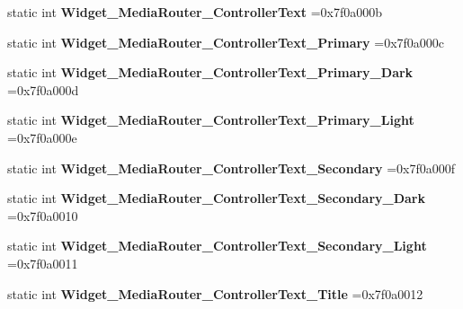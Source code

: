\begin{DoxyCompactItemize}
static int {\bfseries Widget\+\_\+\+Media\+Router\+\_\+\+Controller\+Text} =0x7f0a000b
\item 
\mbox{\label{classandroid_1_1support_1_1v7_1_1appcompat_1_1R_1_1style_ac0b48f6d0fdcad83bf741e24772ccc93}} 
static int {\bfseries Widget\+\_\+\+Media\+Router\+\_\+\+Controller\+Text\+\_\+\+Primary} =0x7f0a000c
\item 
\mbox{\label{classandroid_1_1support_1_1v7_1_1appcompat_1_1R_1_1style_a9ed254b1251537536e7589173d0a1ccd}} 
static int {\bfseries Widget\+\_\+\+Media\+Router\+\_\+\+Controller\+Text\+\_\+\+Primary\+\_\+\+Dark} =0x7f0a000d
\item 
\mbox{\label{classandroid_1_1support_1_1v7_1_1appcompat_1_1R_1_1style_aceca795b7c7f0e08ff1e2d0caf0cbe96}} 
static int {\bfseries Widget\+\_\+\+Media\+Router\+\_\+\+Controller\+Text\+\_\+\+Primary\+\_\+\+Light} =0x7f0a000e
\item 
\mbox{\label{classandroid_1_1support_1_1v7_1_1appcompat_1_1R_1_1style_a110e6b240112126796aa510f5ff2bebd}} 
static int {\bfseries Widget\+\_\+\+Media\+Router\+\_\+\+Controller\+Text\+\_\+\+Secondary} =0x7f0a000f
\item 
\mbox{\label{classandroid_1_1support_1_1v7_1_1appcompat_1_1R_1_1style_a2798f36d52f6989290c5a34dc8d25c2a}} 
static int {\bfseries Widget\+\_\+\+Media\+Router\+\_\+\+Controller\+Text\+\_\+\+Secondary\+\_\+\+Dark} =0x7f0a0010
\item 
\mbox{\label{classandroid_1_1support_1_1v7_1_1appcompat_1_1R_1_1style_abd91649dc2cfc761c12e551cc9496789}} 
static int {\bfseries Widget\+\_\+\+Media\+Router\+\_\+\+Controller\+Text\+\_\+\+Secondary\+\_\+\+Light} =0x7f0a0011
\item 
\mbox{\label{classandroid_1_1support_1_1v7_1_1appcompat_1_1R_1_1style_a1c2277c3cb408e7b6da3e179b4165405}} 
static int {\bfseries Widget\+\_\+\+Media\+Router\+\_\+\+Controller\+Text\+\_\+\+Title} =0x7f0a0012

\end{DoxyCompactItemize}
